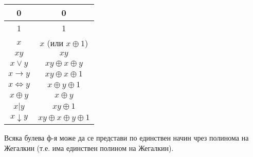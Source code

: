 \begin{tabular}{| c | c |}
    \hline
    0 & 0 \\
    \hline
    1 & 1 \\
    \hline
    \(x\) & \(x\) (или \(x \oplus 1\)) \\
    \hline
    \(xy\) & \(xy\) \\
    \hline
    \(x \vee y\) & \(xy \oplus x \oplus y\) \\
    \hline
    \(x \to y\) & \(xy \oplus x \oplus 1\) \\
    \hline
    \(x \iff y\) & \(x \oplus y \oplus 1\) \\
    \hline
    \(x \oplus y\) & \(x \oplus y\) \\
    \hline
    \(x | y\) & \(xy \oplus 1\) \\
    \hline
    \(x \downarrow y\) & \(xy \oplus x \oplus y \oplus 1\) \\
    \hline
\end{tabular}

\begin{theorem}
    Всяка булева ф-я може да се представи по единствен начин чрез полинома на Жегалкин (т.е. има 
    единствен полином на Жегалкин).
\end{theorem}

